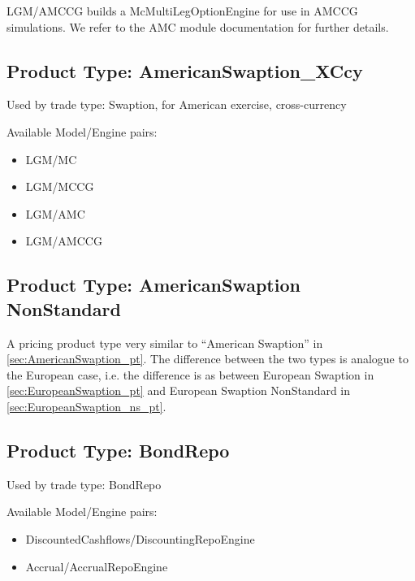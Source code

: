 LGM/AMCCG builds a McMultiLegOptionEngine for use in AMCCG simulations. We refer to the AMC module documentation for
further details.

\subsection{Product Type: AmericanSwaption\_XCcy}
\label{sec:AmericanSwaption_XCcy_pt}
Used by trade type: Swaption, for American exercise, cross-currency

Available Model/Engine pairs:

\begin{itemize}
\item LGM/MC
\item LGM/MCCG
\item LGM/AMC
\item LGM/AMCCG
\end{itemize}

\subsection{Product Type: AmericanSwaption NonStandard}

A pricing product type very similar to ``American Swaption'' in \ref{sec:AmericanSwaption_pt}.
The difference between the two types is analogue to the European case, i.e. the difference is
as between European Swaption in \ref{sec:EuropeanSwaption_pt} and European Swaption NonStandard in \ref{sec:EuropeanSwaption_ns_pt}.

\subsection{Product Type: BondRepo}

Used by trade type: BondRepo

Available Model/Engine pairs:

\begin{itemize}
\item DiscountedCashflows/DiscountingRepoEngine
\item Accrual/AccrualRepoEngine
\end{itemize}


